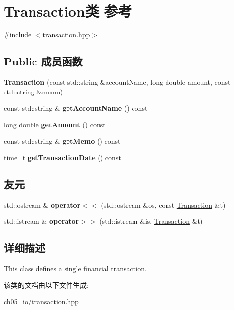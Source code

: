 \hypertarget{class_transaction}{}\section{Transaction类 参考}
\label{class_transaction}


{\ttfamily \#include $<$transaction.\+hpp$>$}

\subsection*{Public 成员函数}
\begin{DoxyCompactItemize}
\item 
\mbox{\label{class_transaction_ada76eada463f7a8761b3492f076a5533}} 
{\bfseries Transaction} (const std\+::string \&account\+Name, long double amount, const std\+::string \&memo)
\item 
\mbox{\label{class_transaction_a950fdd8b74cbd19c40bfd3ea814d0292}} 
const std\+::string \& {\bfseries get\+Account\+Name} () const
\item 
\mbox{\label{class_transaction_aa62193f1c9bfb76f0247e4c0117e4a39}} 
long double {\bfseries get\+Amount} () const
\item 
\mbox{\label{class_transaction_a69d40d9b4b59a2849155e057b615b6b6}} 
const std\+::string \& {\bfseries get\+Memo} () const
\item 
\mbox{\label{class_transaction_abc4c69be3865d8ca95bb0a7e16693276}} 
time\+\_\+t {\bfseries get\+Transaction\+Date} () const
\end{DoxyCompactItemize}
\subsection*{友元}
\begin{DoxyCompactItemize}
\item 
\mbox{\label{class_transaction_a0c82d8cc8b4190d6e5f4a69e0931bb1c}} 
std\+::ostream \& {\bfseries operator$<$$<$} (std\+::ostream \&os, const \mbox{\hyperlink{class_transaction}{Transaction}} \&t)
\item 
\mbox{\label{class_transaction_a4432dd6732577216fd4b462180a4e4db}} 
std\+::istream \& {\bfseries operator$>$$>$} (std\+::istream \&is, \mbox{\hyperlink{class_transaction}{Transaction}} \&t)
\end{DoxyCompactItemize}


\subsection{详细描述}
This class defines a single financial transaction. 

该类的文档由以下文件生成\+:\begin{DoxyCompactItemize}
\item 
ch05\+\_\+io/transaction.\+hpp\end{DoxyCompactItemize}
